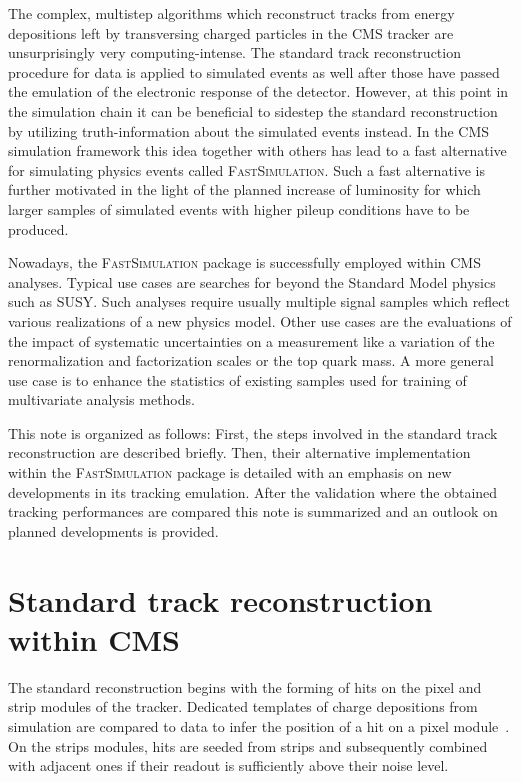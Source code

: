 \documentclass[a4paper]{jpconf}
\begin{document}
The complex, multistep algorithms which reconstruct tracks from energy depositions left by transversing charged particles in the CMS tracker are unsurprisingly very computing-intense. The standard track reconstruction procedure for data is applied to simulated events as well after those have passed the emulation of the electronic response of the detector. However, at this point in the simulation chain it can be beneficial to sidestep the standard reconstruction by utilizing truth-information about the simulated events instead. In the CMS simulation framework this idea together with others has lead to a fast alternative for simulating physics events called \textsc{FastSimulation}. Such a fast alternative is further motivated in the light of the planned increase of luminosity for which larger samples of simulated events with higher pileup conditions have to be produced.

Nowadays, the \textsc{FastSimulation} package is successfully employed within CMS analyses. Typical use cases are searches for beyond the Standard Model physics such as SUSY. Such analyses require usually multiple signal samples which reflect various realizations of a new physics model. Other use cases are the evaluations of the impact of systematic uncertainties on a measurement like a variation of the renormalization and factorization scales or the top quark mass. A more general use case is to enhance the statistics of existing samples used for training of multivariate analysis methods.

This note is organized as follows: First, the steps involved in the standard track reconstruction are described briefly. Then, their alternative implementation within the \textsc{FastSimulation} package is detailed with an emphasis on new developments in its tracking emulation. After the validation where the obtained tracking performances are compared this note is summarized and an outlook on planned developments is provided.


\section{Standard track reconstruction within CMS}

The standard reconstruction begins with the forming of hits on the pixel and strip modules of the tracker. Dedicated templates of charge depositions from simulation are compared to data to infer the position of a hit on a pixel module~\cite{pixelav}. On the strips modules, hits are seeded from strips and subsequently combined with adjacent ones if their readout is sufficiently above their noise level.
\end{document}
